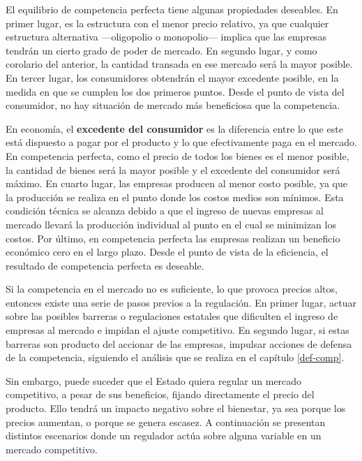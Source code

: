 \documentclass[
  12pt,
  spanish,
]{book}
\begin{document}
El equilibrio de competencia perfecta tiene algunas propiedades deseables. En primer lugar, es la estructura con el menor precio relativo, ya que cualquier estructura alternativa ---oligopolio o monopolio--- implica que las empresas tendrán un cierto grado de poder de mercado. En segundo lugar, y como corolario del anterior, la cantidad transada en ese mercado será la mayor posible. En tercer lugar, los consumidores obtendrán el mayor excedente posible, en la medida en que se cumplen los dos primeros puntos. Desde el punto de vista del consumidor, no hay situación de mercado más beneficiosa que la competencia.

En economía, el \textbf{excedente del consumidor} es la diferencia entre lo que este está dispuesto a pagar por el producto y lo que efectivamente paga en el mercado. En competencia perfecta, como el precio de todos los bienes es el menor posible, la cantidad de bienes será la mayor posible y el excedente del consumidor será máximo. En cuarto lugar, las empresas producen al menor costo posible, ya que la producción se realiza en el punto donde los costos medios son mínimos. Esta condición técnica se alcanza debido a que el ingreso de nuevas empresas al mercado llevará la producción individual al punto en el cual se minimizan los costos. Por último, en competencia perfecta las empresas realizan un beneficio económico cero en el largo plazo. Desde el punto de vista de la eficiencia, el resultado de competencia perfecta es deseable.

Si la competencia en el mercado no es suficiente, lo que provoca precios altos, entonces existe una serie de pasos previos a la regulación. En primer lugar, actuar sobre las posibles barreras o regulaciones estatales que dificulten el ingreso de empresas al mercado e impidan el ajuste competitivo. En segundo lugar, si estas barreras son producto del accionar de las empresas, impulsar acciones de defensa de la competencia, siguiendo el análisis que se realiza en el capítulo \ref{def-comp}.

Sin embargo, puede suceder que el Estado quiera regular un mercado competitivo, a pesar de sus beneficios, fijando directamente el precio del producto. Ello tendrá un impacto negativo sobre el bienestar, ya sea porque los precios aumentan, o porque se genera escasez. A continuación se presentan distintos escenarios donde un regulador actúa sobre alguna variable en un mercado competitivo.
\end{document}
